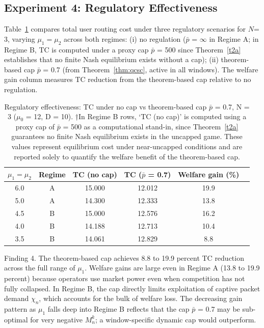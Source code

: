 \documentclass[review,3p,authoryear]{elsarticle}
\begin{document}
\subsection{Experiment 4: Regulatory Effectiveness}
\label{sec6.4}

Table~\ref{tab4} compares total user routing cost under three regulatory scenarios for $N$= 3, varying ${\mu}_{1} = {\mu}_{2}$ across both regimes: (i) no regulation (\ensuremath{\bar{p}} = \ensuremath{\infty} in Regime A; in Regime B, TC is computed under a proxy cap \ensuremath{\bar{p}} = 500 since Theorem~\ref{t2a} establishes that no finite Nash equilibrium exists without a cap); (ii) theorem-based cap \ensuremath{\bar{p}} = 0.7 (from Theorem~\ref{thm:qcsc}, active in all windows). The welfare gain column measures TC reduction from the theorem-based cap relative to no regulation.

\begin{table}[!ht]
\centering
\caption{Regulatory effectiveness: TC under no cap vs theorem-based cap \ensuremath{\bar{p}} = 0.7, N = 3 (\ensuremath{\mu}\ensuremath{_{0}} = 12, D = 10). †In Regime B rows, `TC (no cap)' is computed using a proxy cap of \ensuremath{\bar{p}} = 500 as a computational stand-in, since Theorem~\ref{t2a} guarantees no finite Nash equilibrium exists in the uncapped game. These values represent equilibrium cost under near-uncapped conditions and are reported solely to quantify the welfare benefit of the theorem-based cap.}
\label{tab4}
\begin{tabular}{@{}cccccc@{}}
\toprule
$\mu_1 = \mu_2$ & Regime & TC (no cap)  & TC ($\bar{p}$ = 0.7)     & Welfare gain (\%) \\ \midrule
6.0             & A      & 15.000 & 12.012 & 19.9 &                   \\
5.0             & A      & 14.300 & 12.333 & 13.8   \\
4.5             & B      & 15.000 & 12.576 & 16.2   \\
4.0             & B      & 14.188 & 12.713 & 10.4   \\
3.5             & B      & 14.061 & 12.829 & 8.8   \\ \bottomrule
\end{tabular}
\end{table}

Finding 4. The theorem-based cap achieves 8.8 to 19.9 percent TC reduction across the full range of ${\mu}_{1}$. Welfare gains are large even in Regime A (13.8 to 19.9 percent) because operators use market power even when competition has not fully collapsed. In Regime B, the cap directly limits exploitation of captive packet demand ${\chi}_{n}$, which accounts for the bulk of welfare loss. The decreasing gain pattern as ${\mu}_{1}$ falls deep into Regime B reflects that the cap \ensuremath{\bar{p}} = 0.7 may be sub-optimal for very negative $M_{n}^{k}$; a window-specific dynamic cap would outperform.
\end{document}
